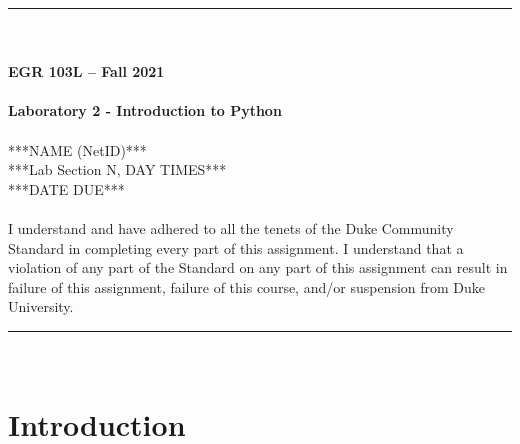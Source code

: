 \documentclass{article}
\begin{document}
\begin{center}
\rule{6.5in}{0.5mm}\\~\\
\textbf{\large EGR 103L -- Fall 2021}\\~\\
\textbf{\huge Laboratory 2 - Introduction to Python}\\~\\
***NAME (NetID)***\\
***Lab Section N, DAY TIMES***\\
***DATE DUE***\\~\\
{\small I understand and have adhered to all the tenets of the Duke Community Standard in completing every part of this assignment.  I understand that a violation of any part of the Standard on any part of this assignment can result in failure of this assignment, failure of this course, and/or suspension from Duke University.} 
\rule{6.5in}{0.5mm}\\
\end{center}
\tableofcontents
\listoffigures
\pagebreak
\section{Introduction}
\end{document}
